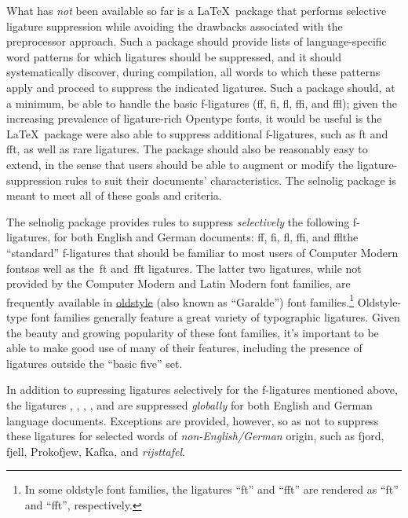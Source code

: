 \documentclass[11pt]{article}
\newcommand{\pkg}[1]{\textsf{#1}}
\begin{document}
What has \emph{not} been available so far is a \LaTeX\ package that performs selective ligature suppression while avoiding the drawbacks associated with the preprocessor approach. Such a package should provide lists of language-specific word patterns for which ligatures should be suppressed, and it should systematically discover, during compilation, all words to which these patterns apply and proceed to suppress the indicated ligatures. Such a package should, at a minimum, be able to handle the basic f-ligatures (ff, fi, fl, ffi, and ffl); given the increasing prevalence of ligature-rich Opentype fonts, it would  be useful is the \LaTeX\ package were also able to suppress additional f-ligatures, such as ft and fft, as well as rare ligatures. The package should also be reasonably easy to extend, in the sense that users should be able to augment or modify the ligature-suppression rules to suit their documents' characteristics. The \pkg{selnolig} package is meant to meet all of these goals and criteria. 

The \pkg{selnolig} package provides rules to suppress \emph{selectively} the following f-ligatures, for both English and German documents: ff, fi, fl, ffi, and ffl\textemdash the \enquote{standard} f-ligatures that should be familiar to most users of Computer Modern fonts\textemdash as well as the~ft and~fft ligatures. The latter two ligatures, while not provided by the Computer Modern and Latin Modern font families, are frequently available in \href{http://en.wikipedia.org/wiki/Serif#Old_Style}{oldstyle} (also known as \enquote{Garalde}) font families.\footnote{In some oldstyle font families, the ligatures \enquote{ft} and \enquote{fft} are rendered as \enquote{\sabon ft} and \enquote{\sabon fft}, respectively.} Oldstyle-type font families generally feature a great variety of typographic ligatures. Given the beauty and growing popularity of these font families, it's important to be able to make good use of many of their features, including the presence of ligatures outside the \enquote{basic five} set. 

In addition to supressing ligatures selectively for the f-ligatures mentioned above, the ligatures {\ebg {}, , , ,} and \emph{} are suppressed \emph{globally} for both English and German language documents. Exceptions are provided, however, so as not to suppress these ligatures for selected words of \emph{non-English\slash German} origin, such as {\ebg fjord, fjell, Prokofjew, Kafka,} and \emph{rijsttafel}.
\end{document}

